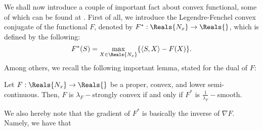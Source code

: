 We shall now introduce a couple of important fact about convex functional, some of which can be found at \cite{kakade2009duality}. First of all, we introduce the  Legendre-Fenchel convex conjugate of the functional $F$, denoted by $F^* : \Reals{N_x} \rightarrow \Reals{}$, which is defined by the following:
\begin{equation}
F^*(S) = \max_{X \in \Reals{N_x}} \{\langle S,X \rangle - F(X) \}.    
\end{equation}
Among others, we recall the following important lemma, stated for the dual of $F$: 
\begin{lemma}
Let $F : \Reals{N_x} \rightarrow \Reals{}$ be a proper, convex, and lower semi-continuous. Then, $F$ is $\lambda_F-$strongly convex if and only if $F^*$ is $\frac{1}{\lambda_F}-$smooth. 
\end{lemma}
We also hereby note that the gradient of $F^*$ is basically the inverse of $\nabla F$. Namely, we have that 
